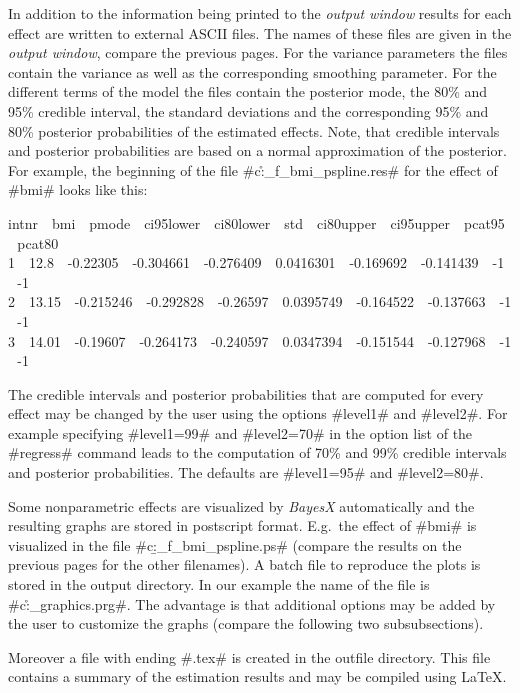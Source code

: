 \documentclass[11pt,a4paper,twoside]{bayesxreport}
\begin{document}
In addition to the information being printed to the {\em output
window} results for each effect are written to external ASCII files.
The names of these files are given in the {\em output window},
compare the previous pages. For the variance parameters the files
contain the variance as well as the corresponding smoothing
parameter. For the different terms of the model the files contain
the posterior mode, the 80\% and 95\% credible interval, the
standard deviations and the corresponding 95\% and 80\% posterior
probabilities of the estimated effects. Note, that credible
intervals and posterior probabilities are based on a normal
approximation of the posterior. For example, the beginning of the
file #c:\data\r_f_bmi_pspline.res# for the effect of #bmi# looks
like this:

{\footnotesize
 intnr \,\, bmi \,\, pmode \,\, ci95lower \,\, ci80lower \,\, std \,\, ci80upper \,\, ci95upper \,\, pcat95 \,\, pcat80\\
 1 \,\, 12.8 \,\, -0.22305 \,\, -0.304661 \,\, -0.276409 \,\, 0.0416301 \,\, -0.169692 \,\, -0.141439 \,\, -1 \,\, -1\\
 2 \,\, 13.15 \,\, -0.215246 \,\, -0.292828 \,\, -0.26597 \,\, 0.0395749 \,\, -0.164522 \,\, -0.137663 \,\, -1 \,\, -1\\
 3 \,\, 14.01 \,\, -0.19607 \,\, -0.264173 \,\, -0.240597 \,\, 0.0347394 \,\, -0.151544 \,\, -0.127968 \,\, -1 \,\, -1}

The credible intervals and posterior probabilities that are computed
for every effect may be changed by the user using the options
#level1# and #level2#. For example specifying #level1=99# and
#level2=70# in the option list of the #regress# command leads to the
computation of 70\% and 99\% credible intervals and posterior
probabilities. The defaults are #level1=95# and #level2=80#.

Some nonparametric effects are visualized by {\em BayesX}
automatically and the resulting graphs are stored in postscript
format. E.g.~the effect of #bmi# is visualized in the file
#c:\data\b_f_bmi_pspline.ps# (compare the results on the previous
pages for the other filenames). A batch file to reproduce the plots
is stored in the output directory. In our example the name of the
file is #c:\data\r_graphics.prg#. The advantage is that additional
options may be added by the user to customize the graphs (compare
the following two subsubsections).

Moreover a file with ending #.tex# is created in the outfile
directory. This file contains a summary of the estimation results
and may be compiled using \LaTeX.
\end{document}
